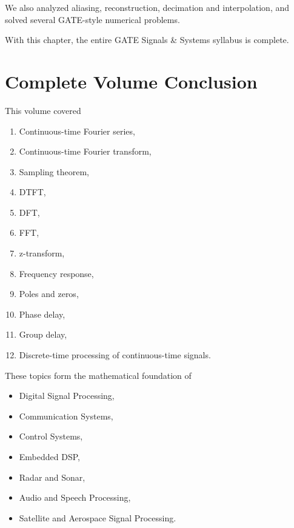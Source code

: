We also analyzed aliasing, reconstruction, decimation and interpolation, and
solved several GATE-style numerical problems.

With this chapter, the entire GATE Signals \& Systems syllabus is complete.


\section{Complete Volume Conclusion}

This volume covered

\begin{enumerate}
\item Continuous-time Fourier series,
\item Continuous-time Fourier transform,
\item Sampling theorem,
\item DTFT,
\item DFT,
\item FFT,
\item z-transform,
\item Frequency response,
\item Poles and zeros,
\item Phase delay,
\item Group delay,
\item Discrete-time processing of continuous-time signals.
\end{enumerate}

These topics form the mathematical foundation of

\begin{itemize}
\item Digital Signal Processing,
\item Communication Systems,
\item Control Systems,
\item Embedded DSP,
\item Radar and Sonar,
\item Audio and Speech Processing,
\item Satellite and Aerospace Signal Processing.
\end{itemize}


